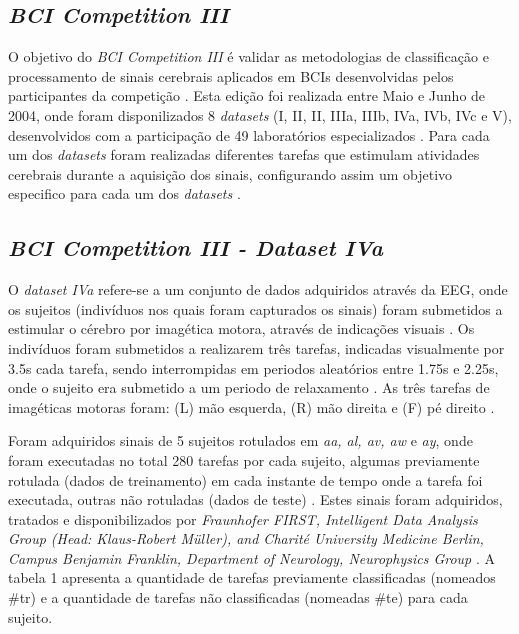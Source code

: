 \subsection{\textit{BCI Competition III}}
O objetivo do \textit{BCI Competition III} é validar as metodologias de classificação e processamento de sinais cerebrais aplicados em BCIs desenvolvidas pelos participantes da competição \cite{siteBCI}. Esta edição foi realizada entre Maio e Junho de 2004, onde foram disponilizados 8 \textit{datasets} (I, II, II, IIIa, IIIb, IVa, IVb, IVc e V), desenvolvidos com a participação de 49 laboratórios especializados \cite{BCICompetition}.
Para cada um dos \textit{datasets} foram realizadas diferentes tarefas que estimulam atividades cerebrais durante a aquisição dos sinais, configurando assim um objetivo especifico para cada um dos \textit{datasets} \cite{siteBCI}.

\subsection{\textit{BCI Competition III - Dataset IVa}}
O \textit{dataset IVa} refere-se a um conjunto de dados adquiridos através da EEG, onde os sujeitos (indivíduos nos quais foram capturados os sinais) foram submetidos a estimular o cérebro por imagética motora, através de indicações visuais \cite{BCICompetition}. Os indivíduos foram submetidos a realizarem três tarefas, indicadas visualmente por 3.5s cada tarefa, sendo interrompidas em periodos aleatórios entre 1.75s e 2.25s, onde o sujeito era submetido a um periodo de relaxamento \cite{BCICompetition}. As três tarefas de imagéticas motoras foram: (L) mão esquerda, (R) mão direita e (F) pé direito \cite{BCICompetition}.

Foram adquiridos sinais de 5 sujeitos rotulados em \textit{aa, al, av, aw} e \textit{ay}, onde foram executadas no total 280 tarefas por cada sujeito, algumas previamente rotulada (dados de treinamento) em cada instante de tempo onde a tarefa foi executada, outras não rotuladas (dados de teste) \cite{siteBCI}. Estes sinais foram adquiridos, tratados e disponibilizados por \textit{Fraunhofer FIRST, Intelligent Data Analysis Group (Head: Klaus-Robert Müller), and Charité University Medicine Berlin, Campus Benjamin Franklin, Department of Neurology, Neurophysics Group} \cite{BCICompetition}. A tabela 1 apresenta a quantidade de tarefas previamente classificadas (nomeados \#tr) e a quantidade de tarefas não classificadas (nomeadas \#te) para cada sujeito.

